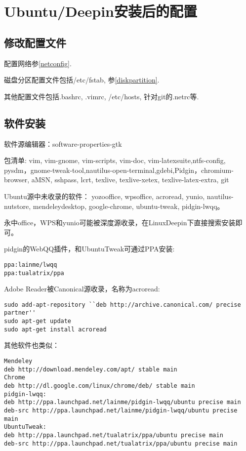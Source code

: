 \section{Ubuntu/Deepin安装后的配置}


\subsection{修改配置文件}
配置网络参\ref{netconfig}.

磁盘分区配置文件包括/etc/fstab, 参\ref{diskpartition}.

其他配置文件包括.bashrc, .vimrc, /etc/hosts, 针对git的.netrc等.

\subsection{软件安装}

软件源编辑器：software-properties-gtk

包清单:
vim, vim-gnome, vim-scripts, vim-doc, vim-latexsuite,ntfs-config, pysdm，gnome-tweak-tool,nautilus-open-terminal,gdebi,Pidgin，chromium-browser, aMSN, sshpass, lcrt, texlive, texlive-xetex, texlive-latex-extra, git

Ubuntu源中未收录的软件：
yozooffice, wpsoffice, acroread, yunio, nautilus-nutstore, mendeleydesktop, google-chrome, ubuntu-tweak, pidgin-lwqq。

永中office，WPS和yunio可能被深度源收录，在LinuxDeepin下直接搜索安装即可。

pidgin的WebQQ插件，和UbuntuTweak可通过PPA安装:
\begin{lstlisting}
ppa:lainme/lwqq
ppa:tualatrix/ppa
\end{lstlisting}

Adobe Reader被Canonical源收录，名称为acroread:
\begin{lstlisting}
sudo add-apt-repository ``deb http://archive.canonical.com/ precise partner''
sudo apt-get update
sudo apt-get install acroread
\end{lstlisting}

其他软件也类似：
\begin{lstlisting}
Mendeley
deb http://download.mendeley.com/apt/ stable main 
Chrome
deb http://dl.google.com/linux/chrome/deb/ stable main
pidgin-lwqq:
deb http://ppa.launchpad.net/lainme/pidgin-lwqq/ubuntu precise main
deb-src http://ppa.launchpad.net/lainme/pidgin-lwqq/ubuntu precise main
UbuntuTweak:
deb http://ppa.launchpad.net/tualatrix/ppa/ubuntu precise main
deb-src http://ppa.launchpad.net/tualatrix/ppa/ubuntu precise main
\end{lstlisting}

